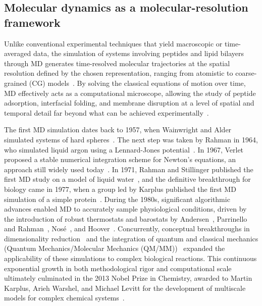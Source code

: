 \subsection{Molecular dynamics as a molecular-resolution framework}

Unlike conventional experimental techniques that yield macroscopic or time-averaged data, the simulation of systems involving peptides and lipid bilayers through MD generates time-resolved molecular trajectories at the spatial resolution defined by the chosen representation, ranging from atomistic to coarse-grained (CG) models~\cite{dror2012biomolecular,Sousa2010}. By solving the classical equations of motion over time, MD effectively acts as a computational microscope, allowing the study of peptide adsorption, interfacial folding, and membrane disruption at a level of spatial and temporal detail far beyond what can be achieved experimentally~\cite{TIELEMAN1997235}.

The first MD simulation dates back to 1957, when Wainwright and Alder simulated systems of hard spheres~\cite{alder1957phase}. The next step was taken by Rahman in 1964, who simulated liquid argon using a Lennard-Jones potential~\cite{rahman1964correlations}. In 1967, Verlet proposed a stable numerical integration scheme for Newton's equations, an approach still widely used today~\cite{Verlet1967}. In 1971, Rahman and Stillinger published the first MD study on a model of liquid water~\cite{Rahman1971}, and the definitive breakthrough for biology came in 1977, when a group led by Karplus published the first MD simulation of a simple protein~\cite{McCammon1977}. During the 1980s, significant algorithmic advances enabled MD to accurately sample physiological conditions, driven by the introduction of robust thermostats and barostats by Andersen~\cite{Andersen1980}, Parrinello and Rahman~\cite{Parrinello1980,Parrinello1981}, Nosé~\cite{Nose1984}, and Hoover~\cite{Hoover1985}. Concurrently, conceptual breakthroughs in dimensionality reduction~\cite{Levitt1975} and the integration of quantum and classical mechanics (Quantum Mechanics/Molecular Mechanics (QM/MM))~\cite{WARSHEL1976227,Warshel1972} expanded the applicability of these simulations to complex biological reactions. This continuous exponential growth in both methodological rigor and computational scale ultimately culminated in the 2013 Nobel Prize in Chemistry, awarded to Martin Karplus, Arieh Warshel, and Michael Levitt for the development of multiscale models for complex chemical systems~\cite{nobel_chemistry_2013,royal_swedish_academy_2013}.

